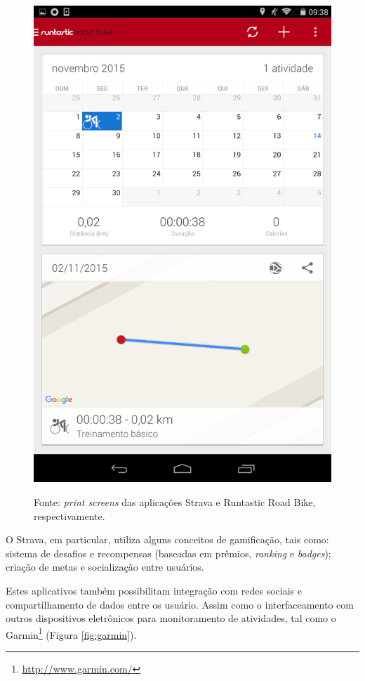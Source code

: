 \begin{figure}[h]
\begin{minipage}{.5\textwidth}
  \includegraphics[width=.8\linewidth]{figuras/Runtastic.png}
  \label{fig:Runtastic}
  \newline
\end{minipage}
\centerline{Fonte: \textit{print screens} das aplicações Strava e Runtastic Road Bike, respectivamente.}
\end{figure}

O Strava, em particular, utiliza alguns conceitos de gamificação, tais como: sistema de desafios e recompensas (baseadas em prêmios, \textit{ranking} e \textit{badges}); criação de metas e socialização entre usuários. \par 

Estes aplicativos também possibilitam integração com redes sociais e compartilhamento de dados entre os usuário. Assim como o interfaceamento com outros dispositivos eletrônicos para monitoramento de atividades, tal como o Garmin\footnote{\url{http://www.garmin.com/}} (Figura \ref{fig:garmin}). \par 

